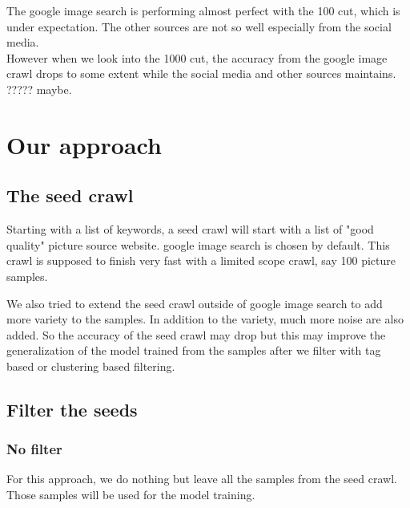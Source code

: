 \documentclass[paper=a4, fontsize=11pt]{scrartcl}
\numberwithin{equation}{section}		%
\numberwithin{figure}{section}			%
\numberwithin{table}{section}				%
\begin{document}
\noindent The google image search is performing almost perfect with the 100 cut, which is under expectation. The other sources are not so well especially from the social media.\\

\noindent However when we look into the 1000 cut, the accuracy from the google image crawl drops to some extent while the social media and other sources maintains. ????? maybe.

\section{Our approach}

\subsection{The seed crawl}

Starting with a list of keywords, a seed crawl will start with a list of "good quality" picture source website.
google image search is chosen by default.
This crawl is supposed to finish very fast with a limited scope crawl, say 100 picture samples.

We also tried to extend the seed crawl outside of google image search to add more variety to the samples. In addition to the variety, much more noise are also added. So the accuracy of the seed crawl may drop but this may improve the generalization of the model trained from the samples after we filter with tag based or clustering based filtering.

\subsection{Filter the seeds}

\subsubsection{No filter}

For this approach, we do nothing but leave all the samples from the seed crawl. Those samples will be used for the model training.
\end{document}
